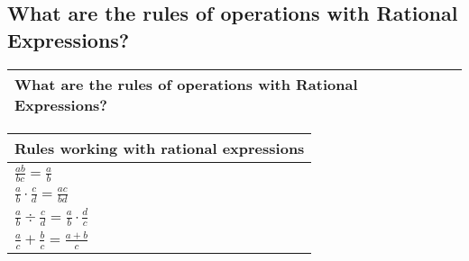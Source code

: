\subsection{What are the rules of operations with Rational Expressions?}
\begin{small}
    \begin{tabularx}{1\textwidth}{
            p{}
        }
        \toprule
        What are the rules of operations with Rational Expressions?
        \\
        \bottomrule
    \end{tabularx}
\end{small}
\begin{small}
    \begin{tabularx}{1\textwidth}{
            p{}
            p{}
        }
        \toprule
        \multicolumn{2}{c}{\textbf{Rules working with rational expressions}} \\
        \midrule

        $ \frac{ab}{bc} = \frac{a}{b} $
        &
        \\
        \midrule

        $ \frac{a}{b} \cdot  \frac{c}{d} = \frac{ac}{bd} $
        &
        \\
        \midrule

        $ \frac{a}{b} \div  \frac{c}{d} = \frac{a}{b} \cdot  \frac{d}{c} $
        &
        \\
        \midrule

        $ \frac{a}{c} +  \frac{b}{c} = \frac{a + b}{c} $
        &
        \\
        \bottomrule
    \end{tabularx}

\end{small}
